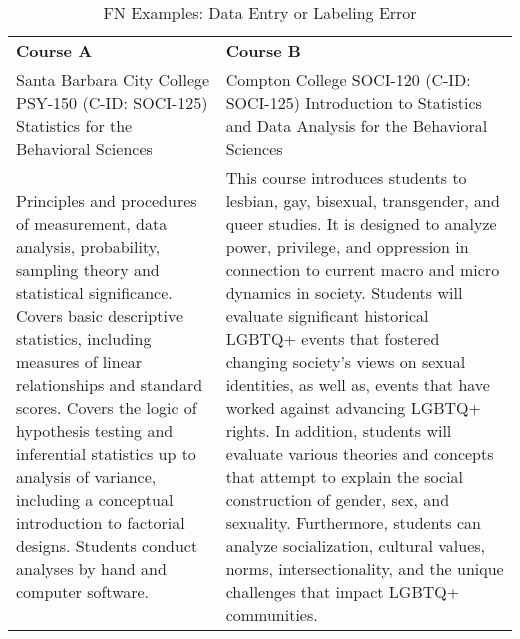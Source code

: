 \begin{longtable}{ >{\baselineskip=12pt}p{}  >{\baselineskip=12pt}p{} }
\captionsetup{skip=5pt}
\caption{FN Examples: Data Entry or Labeling Error}\label{tab:fn_incomplete}\\
\bottomrule\toprule
\textbf{Course A} & \textbf{Course B} \\
\bottomrule\toprule
\endhead
Santa Barbara City College \newline PSY-150 (C-ID: SOCI-125) \newline Statistics for the Behavioral Sciences & Compton College \newline SOCI-120 (C-ID: SOCI-125) \newline Introduction to Statistics and Data Analysis for the Behavioral Sciences \\
\midrule
Principles and procedures of measurement, data analysis, probability, sampling theory and statistical significance. Covers basic descriptive statistics, including measures of linear relationships and standard scores. Covers the logic of hypothesis testing and inferential statistics up to analysis of variance, including a conceptual introduction to factorial designs. Students conduct analyses by hand and computer software. & This course introduces students to lesbian, gay, bisexual, transgender, and queer studies. It is designed to analyze power, privilege, and oppression in connection to current macro and micro dynamics in society. Students will evaluate significant historical LGBTQ+ events that fostered changing society's views on sexual identities, as well as, events that have worked against advancing LGBTQ+ rights. In addition, students will evaluate various theories and concepts that attempt to explain the social construction of gender, sex, and sexuality. Furthermore, students can analyze socialization, cultural values, norms, intersectionality, and the unique challenges that impact LGBTQ+ communities.\\
\bottomrule\toprule
\end{longtable}